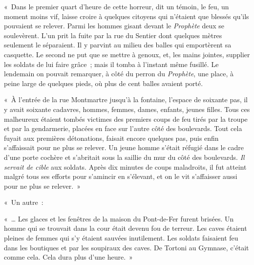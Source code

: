 \documentclass[french,twoside]{book} %
\newenvironment{quoteblock}%
  {\begin{quoting}}
  {\end{quoting}}
\newenvironment{quotebar}{%
    \def\FrameCommand{{\color{rubric!10!}\vrule width 0.5em} \hspace{0.9em}}%
    \def\OuterFrameSep{\itemsep} %
    \MakeFramed {\advance\hsize-\width \FrameRestore}
  }%
  {%
    \endMakeFramed
  }
\renewenvironment{quoteblock}%
  {%
    \savenotes
    \setstretch{0.9}
    \normalfont
    \begin{quotebar}
  }
  {%
    \end{quotebar}
    \spewnotes
  }
\begin{document}
\begin{quoteblock}
 \noindent « Dans le premier quart d’heure de cette horreur, dit un témoin, le feu, un moment moins vif, laisse croire à quelques citoyens qui n’étaient que blessés qu’ils pouvaient se relever. Parmi les hommes gisant devant le \emph{Prophète} deux se soulevèrent. L’un prit la fuite par la rue du Sentier dont quelques mètres seulement le séparaient. Il y parvint au milieu des balles qui emportèrent sa casquette. Le second ne put que se mettre à genoux, et, les mains jointes, supplier les soldats de lui faire grâce ; mais il tomba à l’instant même fusillé. Le lendemain on pouvait remarquer, à côté du perron du \emph{Prophète}, une place, à peine large de quelques pieds, où plus de cent balles avaient porté.\par
 « À l’entrée de la rue Montmartre jusqu’à la fontaine, l’espace de soixante pas, il y avait soixante cadavres, hommes, femmes, dames, enfants, jeunes filles. Tous ces malheureux étaient tombés victimes des premiers coups de feu tirés par la troupe et par la gendarmerie, placées en face sur l’autre côté des boulevards. Tout cela fuyait aux premières détonations, faisait encore quelques pas, puis enfin s’affaissait pour ne plus se relever. Un jeune homme s’était réfugié dans le cadre d’une porte cochère et s’abritait sous la saillie du mur du côté des boulevards. \emph{Il servait de cible} aux soldats. Après dix minutes de coups maladroits, il fut atteint malgré tous ses efforts pour s’amincir en s’élevant, et on le vit s’affaisser aussi pour ne plus se relever. »
 \end{quoteblock}

\noindent « Un autre :\par

\begin{quoteblock}
 \noindent « … Les glaces et les fenêtres de la maison du Pont-de-Fer furent brisées. Un homme qui se trouvait dans la cour était devenu fou de terreur. Les caves étaient pleines de femmes qui s’y étaient sauvées inutilement. Les soldats faisaient feu dans les boutiques et par les soupiraux des caves. De Tortoni au Gymnase, c’était comme cela. Cela dura plus d’une heure. »
 \end{quoteblock}
\end{document}
